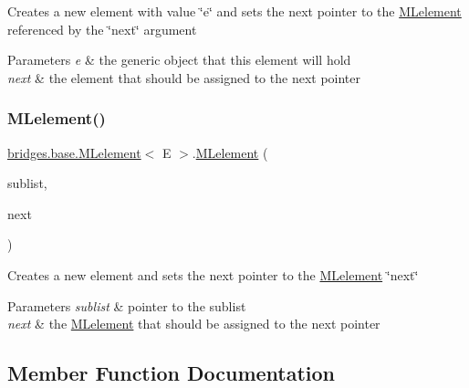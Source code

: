 Creates a new element with value \char`\"{}e\char`\"{} and sets the next pointer to the \hyperlink{classbridges_1_1base_1_1_m_lelement}{M\+Lelement} referenced by the \char`\"{}next\char`\"{} argument


\begin{DoxyParams}{Parameters}
{\em e} & the generic object that this element will hold \\
\hline
{\em next} & the element that should be assigned to the next pointer \\
\hline
\end{DoxyParams}
\mbox{\label{classbridges_1_1base_1_1_m_lelement_aa660281523a7de140a0b17737096a332}} 
\subsubsection{\texorpdfstring{M\+Lelement()}{MLelement()}\hspace{0.1cm}{\footnotesize\ttfamily [4/4]}}
{\footnotesize\ttfamily \hyperlink{classbridges_1_1base_1_1_m_lelement}{bridges.\+base.\+M\+Lelement}$<$ E $>$.\hyperlink{classbridges_1_1base_1_1_m_lelement}{M\+Lelement} (\begin{DoxyParamCaption}\item[{\hyperlink{classbridges_1_1base_1_1_m_lelement}{M\+Lelement}$<$ E $>$}]{sublist,  }\item[{\hyperlink{classbridges_1_1base_1_1_m_lelement}{M\+Lelement}$<$ E $>$}]{next }\end{DoxyParamCaption})}

Creates a new element and sets the next pointer to the \hyperlink{classbridges_1_1base_1_1_m_lelement}{M\+Lelement} \char`\"{}next\char`\"{} 
\begin{DoxyParams}{Parameters}
{\em sublist} & pointer to the sublist \\
\hline
{\em next} & the \hyperlink{classbridges_1_1base_1_1_m_lelement}{M\+Lelement} that should be assigned to the next pointer \\
\hline
\end{DoxyParams}


\subsection{Member Function Documentation}
\mbox{\label{classbridges_1_1base_1_1_m_lelement_aa2e26697e2c70a36b8345a324d00679a}} 
